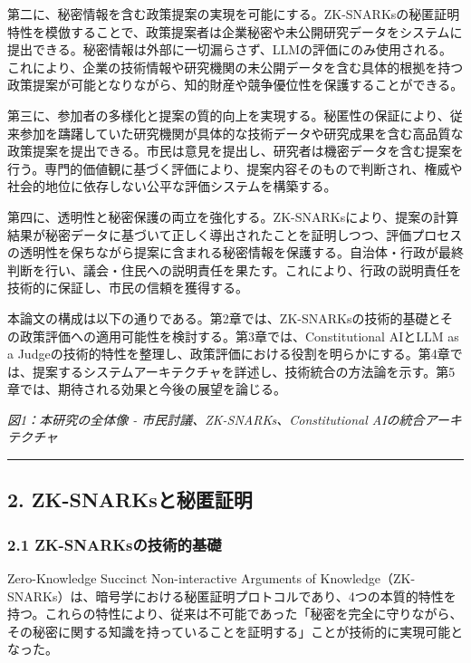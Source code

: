 第二に、秘密情報を含む政策提案の実現を可能にする。ZK-SNARKsの秘匿証明特性を模倣することで、政策提案者は企業秘密や未公開研究データをシステムに提出できる。秘密情報は外部に一切漏らさず、LLMの評価にのみ使用される。これにより、企業の技術情報や研究機関の未公開データを含む具体的根拠を持つ政策提案が可能となりながら、知的財産や競争優位性を保護することができる。

第三に、参加者の多様化と提案の質的向上を実現する。秘匿性の保証により、従来参加を躊躇していた研究機関が具体的な技術データや研究成果を含む高品質な政策提案を提出できる。市民は意見を提出し、研究者は機密データを含む提案を行う。専門的価値観に基づく評価により、提案内容そのもので判断され、権威や社会的地位に依存しない公平な評価システムを構築する。

第四に、透明性と秘密保護の両立を強化する。ZK-SNARKsにより、提案の計算結果が秘密データに基づいて正しく導出されたことを証明しつつ、評価プロセスの透明性を保ちながら提案に含まれる秘密情報を保護する。自治体・行政が最終判断を行い、議会・住民への説明責任を果たす。これにより、行政の説明責任を技術的に保証し、市民の信頼を獲得する。

本論文の構成は以下の通りである。第2章では、ZK-SNARKsの技術的基礎とその政策評価への適用可能性を検討する。第3章では、Constitutional AIとLLM as a Judgeの技術的特性を整理し、政策評価における役割を明らかにする。第4章では、提案するシステムアーキテクチャを詳述し、技術統合の方法論を示す。第5章では、期待される効果と今後の展望を論じる。

\pandocbounded{}
\emph{図1：本研究の全体像 - 市民討議、ZK-SNARKs、Constitutional AIの統合アーキテクチャ}

\begin{center}\rule{0.5\linewidth}{0.5pt}\end{center}

\subsection{2. ZK-SNARKsと秘匿証明}\label{zk-snarksux3068ux79d8ux533fux8a3cux660e}

\subsubsection{2.1 ZK-SNARKsの技術的基礎}\label{zk-snarksux306eux6280ux8853ux7684ux57faux790e}

Zero-Knowledge Succinct Non-interactive Arguments of Knowledge（ZK-SNARKs）は、暗号学における秘匿証明プロトコルであり、4つの本質的特性を持つ。これらの特性により、従来は不可能であった「秘密を完全に守りながら、その秘密に関する知識を持っていることを証明する」ことが技術的に実現可能となった。

